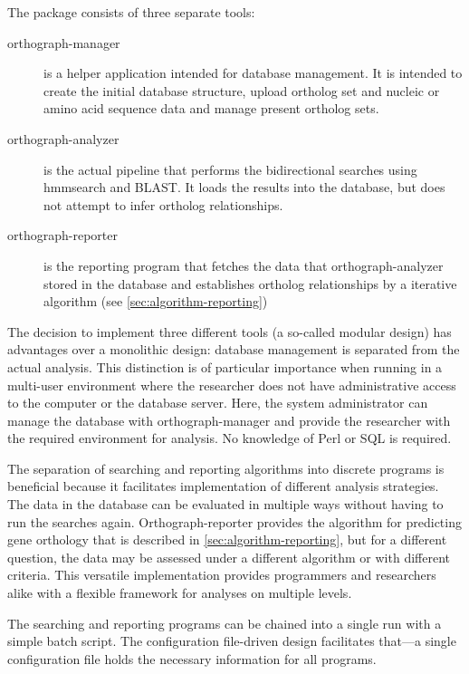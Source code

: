 \label{sec:algorithm}
The \pname package consists of three separate tools:

\begin{description}
	\item[orthograph-manager] is a helper application intended for database
		management. It is intended to create the initial database structure, upload
		ortholog set and nucleic or amino acid sequence data and manage present
		ortholog sets.
	\item[orthograph-analyzer] is the actual pipeline that performs the
		bidirectional searches using hmmsearch and BLAST. It loads the results into
		the database, but does not attempt to infer ortholog relationships. 
	\item[orthograph-reporter] is the reporting program that fetches the data that
		orthograph-analyzer stored in the database and establishes ortholog
		relationships by a iterative algorithm (see
		\autoref{sec:algorithm-reporting})
\end{description}

The decision to implement three different tools (a so-called modular design) has
advantages over a monolithic design: database management is separated from the
actual analysis. This distinction is of particular importance when running
\pname in a multi-user environment where the researcher does not have
administrative access to the computer or the database server. Here, the system
administrator can manage the database with orthograph-manager and provide the
researcher with the required environment for analysis. No knowledge of Perl or
SQL is required.

The separation of searching and reporting algorithms into discrete programs is
beneficial because it facilitates implementation of different analysis
strategies. The data in the database can be evaluated in multiple ways without
having to run the searches again. Orthograph-reporter provides the algorithm for
predicting gene orthology that is described in
\autoref{sec:algorithm-reporting}, but for a different question, the data may be
assessed under a different algorithm or with different criteria. This versatile
implementation provides programmers and researchers alike with a flexible
framework for analyses on multiple levels. 

The searching and reporting programs can be chained into a single run
with a simple batch script. The configuration file-driven design facilitates
that---a single configuration file holds the necessary information for all
\pname programs.
